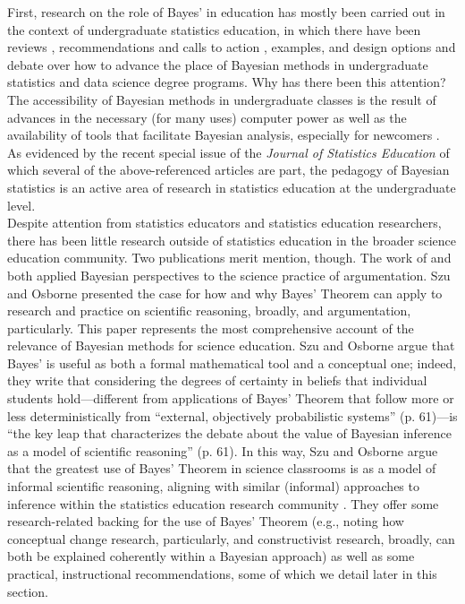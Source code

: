 \documentclass[man, floatsintext]{apa7} %
\begin{document}
First, research on the role of Bayes' in education has mostly been carried out in the context of undergraduate statistics education, in which there have been reviews \parencite{dogucu2021}, recommendations and calls to action \parencite{gpkpwc18, h_a20, dogucu2021}, examples, and design options \parencite{a02, b02,g08, w17, h_j20} and debate \parencite{jrhrr20} over how to advance the place of Bayesian methods in undergraduate statistics and data science degree programs. Why has there been this attention? The accessibility of Bayesian methods in undergraduate classes is the result of advances in the necessary (for many uses) computer power \parencite{gpkpwc18} as well as the availability of tools that facilitate Bayesian analysis, especially for newcomers \parencite{ah20}. As evidenced by the recent special issue of the \emph{Journal of Statistics Education} of which several of the above-referenced articles are part, the pedagogy of Bayesian statistics is an active area of research in statistics education at the undergraduate level. \\

Despite attention from statistics educators and statistics education researchers, there has been little research outside of statistics education in the broader science education community. Two publications merit mention, though. The work of \textcite{so12} and \textcite{n11} both applied Bayesian perspectives to the science practice of argumentation. Szu and Osborne presented the case for how and why Bayes' Theorem can apply to research and practice on scientific reasoning, broadly, and argumentation, particularly. This paper represents the most comprehensive account of the relevance of Bayesian methods for science education. Szu and Osborne argue that Bayes' is useful as both a formal mathematical tool and a conceptual one; indeed, they write that considering the degrees of certainty in beliefs that individual students hold—different from applications of Bayes' Theorem that follow more or less deterministically from ``external, objectively probabilistic systems'' (p. 61)—is ``the key leap that characterizes the debate about the value of Bayesian inference as a model of scientific reasoning'' (p. 61). In this way, Szu and Osborne argue that the greatest use of Bayes' Theorem in science classrooms is as a model of informal scientific reasoning, aligning with similar (informal) approaches to inference within the statistics education research community \parencite{batanero2016research, mr18}. They offer some research-related backing for the use of Bayes' Theorem (e.g., noting how conceptual change research, particularly, and constructivist research, broadly, can both be explained coherently within a Bayesian approach) as well as some practical, instructional recommendations, some of which we detail later in this section. \\
\end{document}

